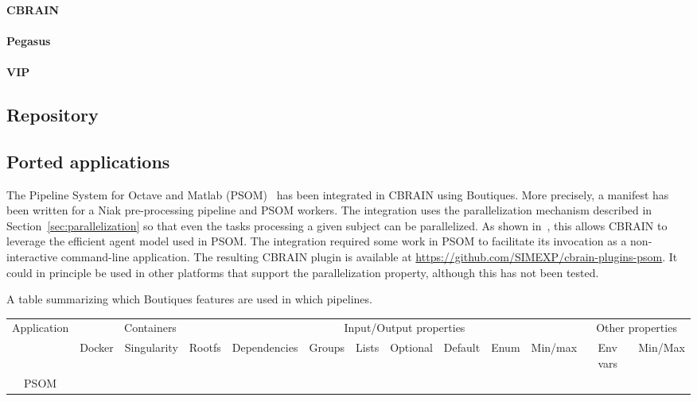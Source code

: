 \documentclass{article}
\begin{document}
\paragraph{CBRAIN}




\paragraph{Pegasus}

\paragraph{VIP}

\subsection{Repository}

\subsection{Ported applications}



The Pipeline System for Octave and Matlab
(PSOM)~\cite{bellec2012pipeline} has been integrated in CBRAIN using
Boutiques. More precisely, a manifest has been written for a Niak
pre-processing pipeline and PSOM workers. The integration uses the
parallelization mechanism described in
Section~\ref{sec:parallelization} so that even the tasks processing a
given subject can be parallelized. As shown in~\cite{GLAT-16}, this
allows CBRAIN to leverage the efficient agent model used in PSOM. The
integration required some work in PSOM to facilitate its invocation as
a non-interactive command-line application. The resulting CBRAIN
plugin is available at
\url{https://github.com/SIMEXP/cbrain-plugins-psom}. It could in
principle be used in other platforms that support the parallelization
property, although this has not been tested.


A table summarizing which Boutiques features are used in which pipelines.

\begin{tabular}{ccccccccccccc}
  Application & \multicolumn{3}{c}{Containers} & \multicolumn{7}{c}{Input/Output properties}                         & \multicolumn{2}{c}{Other properties}  \\
              & Docker & Singularity & Rootfs  & Dependencies & Groups & Lists & Optional & Default & Enum & Min/max & Env vars & Min/Max \\


PSOM & 
\end{tabular}
\end{document}
